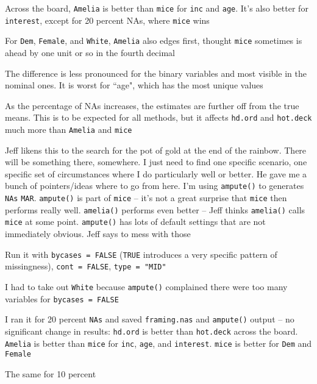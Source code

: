 \documentclass[12pt]{article}
\begin{document}
\begin{coi}
\begin{coi}
				\item Across the board, \texttt{Amelia} is better than \texttt{mice} for \texttt{inc} and \texttt{age}. It's also better for \texttt{interest}, except for 20 percent NAs, where \texttt{mice} wins
				\item For \texttt{Dem}, \texttt{Female}, and \texttt{White}, \texttt{Amelia} also edges first, thought \texttt{mice} sometimes is ahead by one unit or so in the fourth decimal
				\item The difference is less pronounced for the binary variables and most visible in the nominal ones. It is worst for ``age", which has the most unique values
				\item As the percentage of NAs increases, the estimates are further off from the true means. This is to be expected for all methods, but it affects \texttt{hd.ord} and \texttt{hot.deck} much more than \texttt{Amelia} and \texttt{mice}
			\end{coi}
		\item Jeff likens this to the search for the pot of gold at the end of the rainbow. There will be something there, somewhere. I just need to find one specific scenario, one specific set of circumstances where I do particularly well or better. He gave me a bunch of pointers/ideas where to go from here. I'm using \texttt{ampute()} to generates \texttt{NAs} \texttt{MAR}. \texttt{ampute()} is part of \texttt{mice} -- it's not a great surprise that \texttt{mice} then performs really well. \texttt{amelia()} performs even better -- Jeff thinks \texttt{amelia()} calls \texttt{mice} at some point. \texttt{ampute()} has lots of default settings that are not immediately obvious. Jeff says to mess with those
		\item Run it with \texttt{bycases = FALSE} (\texttt{TRUE} introduces a very specific pattern of missingness), \texttt{cont = FALSE}, \texttt{type = "MID"}
			\begin{coi}
				\item I had to take out \texttt{White} because \texttt{ampute()} complained there were too many variables for \texttt{bycases = FALSE}
				\item I ran it for 20 percent \texttt{NAs} and saved \texttt{framing.nas} and \texttt{ampute()} output -- no significant change in results: \texttt{hd.ord} is better than \texttt{hot.deck} across the board. \texttt{Amelia} is better than \texttt{mice} for \texttt{inc}, \texttt{age}, and \texttt{interest}. \texttt{mice} is better for \texttt{Dem} and \texttt{Female}
				\item The same for 10 percent

\end{coi}
\end{coi}
\end{document}
